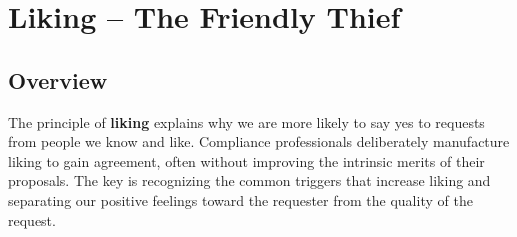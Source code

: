 \section{Liking – The Friendly Thief}

\subsection*{Overview}
The principle of \textbf{liking} explains why we are more likely to say yes to requests from people we know and like. Compliance professionals deliberately manufacture liking to gain agreement, often without improving the intrinsic merits of their proposals. The key is recognizing the common triggers that increase liking and separating our positive feelings toward the requester from the quality of the request.

